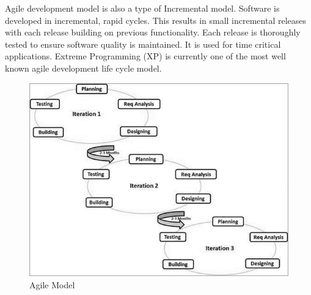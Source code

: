 Agile development model is also a type of Incremental model. Software is developed in incremental, rapid cycles. This results in small incremental releases with each release building on previous functionality. Each release is thoroughly tested to ensure software quality is maintained. It is used for time critical applications.  Extreme Programming (XP) is currently one of the most well known agile development life cycle model. 
\begin{figure}[ht]
\centering
\includegraphics[scale=0.5]{images/AgileModel.jpg}
\caption{Agile Model}
\end{figure}


